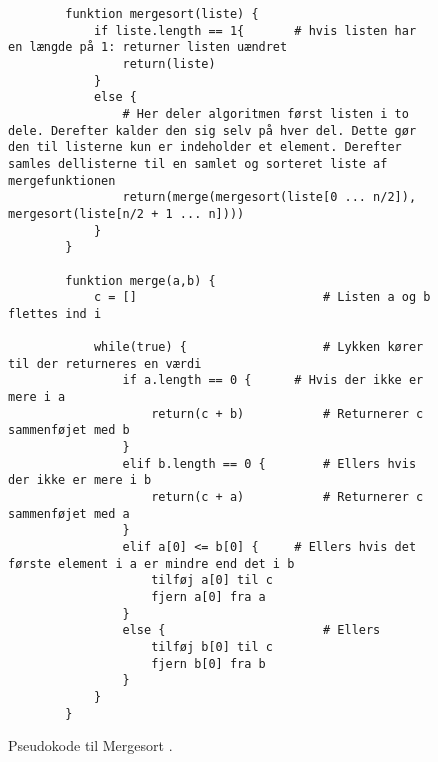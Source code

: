 \begin{figure}
\begin{center}
	\begin{lstlisting}
		funktion mergesort(liste) {
			if liste.length == 1{ 		# hvis listen har en længde på 1: returner listen uændret
				return(liste)
			}
			else {
				# Her deler algoritmen først listen i to dele. Derefter kalder den sig selv på hver del. Dette gør den til listerne kun er indeholder et element. Derefter samles dellisterne til en samlet og sorteret liste af mergefunktionen
				return(merge(mergesort(liste[0 ... n/2]), mergesort(liste[n/2 + 1 ... n])))
			}
		}

		funktion merge(a,b) {
			c = []							# Listen a og b flettes ind i

			while(true) {					# Lykken kører til der returneres en værdi 
				if a.length == 0 {		# Hvis der ikke er mere i a
					return(c + b)			# Returnerer c sammenføjet med b
				}
				elif b.length == 0 {		# Ellers hvis der ikke er mere i b
					return(c + a)			# Returnerer c sammenføjet med a
				}
				elif a[0] <= b[0] {		# Ellers hvis det første element i a er mindre end det i b
					tilføj a[0] til c
					fjern a[0] fra a
				}
				else {						# Ellers
					tilføj b[0] til c
					fjern b[0] fra b
				}
			}
		}

	\end{lstlisting}
\end{center}
\vspace{-5mm}
\caption{Pseudokode til Mergesort \cite[s. 106]{aogd}.}
\label{fig:Pseudokode til mergesort}
\end{figure}



